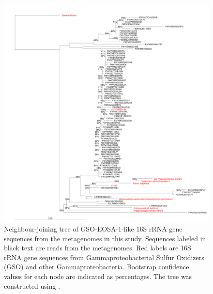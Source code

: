 \begin{figure}[!ht]
  \centering
  \includegraphics[width=\textwidth]{../polarfront/GSO-EOSA-1tree.png}
  \caption[Tree of GSO-EOSA-1 related 16S rRNA genes]{
  Neighbour-joining tree of GSO-EOSA-1-like 16S rRNA gene sequences from the metagenomes in this study.
  Sequences labeled in black text are reads from the metagenomes.
  Red labels are 16S rRNA gene sequences from Gammaproteobacterial Sulfur Oxidizers (GSO) and other Gammaproteobacteria.
  Bootstrap confidence values for each node are indicated as percentages.
  The tree was constructed using  \cite{Ludwig:2004dg}.
  }
  \label{fig:GSO-EOSA-1tree}
\end{figure}
\clearpage
